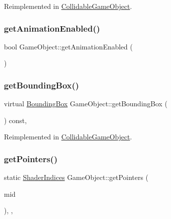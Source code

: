 Reimplemented in \hyperlink{class_collidable_game_object_aabc837db5ee83847ad55a5f95cb106a6}{Collidable\+Game\+Object}.

\mbox{\label{class_game_object_ae3a7ab65df0dc3fb241a5a35a390fb3b}} 
\subsubsection{\texorpdfstring{get\+Animation\+Enabled()}{getAnimationEnabled()}}
{\footnotesize\ttfamily bool Game\+Object\+::get\+Animation\+Enabled (\begin{DoxyParamCaption}{ }\end{DoxyParamCaption})\hspace{0.3cm}{\ttfamily [inline]}}

\mbox{\label{class_game_object_a64b37bea01266aea52a47f4a48a9cc84}} 
\subsubsection{\texorpdfstring{get\+Bounding\+Box()}{getBoundingBox()}}
{\footnotesize\ttfamily virtual \hyperlink{class_bounding_box}{Bounding\+Box} Game\+Object\+::get\+Bounding\+Box (\begin{DoxyParamCaption}{ }\end{DoxyParamCaption}) const\hspace{0.3cm}{\ttfamily [inline]}, {\ttfamily [virtual]}}



Reimplemented in \hyperlink{class_collidable_game_object_a7998e4aabd23263212e72f6a40d42036}{Collidable\+Game\+Object}.

\mbox{\label{class_game_object_a8fac812880b4c8c086b9263ffb2e88b3}} 
\subsubsection{\texorpdfstring{get\+Pointers()}{getPointers()}}
{\footnotesize\ttfamily static \hyperlink{struct_shader_indices}{Shader\+Indices} Game\+Object\+::get\+Pointers (\begin{DoxyParamCaption}\item[{G\+Lint}]{mid }\end{DoxyParamCaption})\hspace{0.3cm}{\ttfamily [inline]}, {\ttfamily [static]}, {\ttfamily [protected]}}

